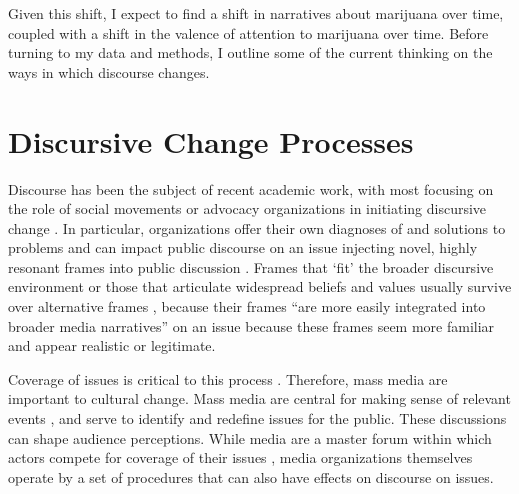 Given this shift, I expect to find a shift in narratives about marijuana over time, coupled with a shift in the valence of attention to marijuana over time. Before turning to my data and methods, I outline some of the current thinking on the ways in which discourse changes. 




%

%







\section{Discursive Change Processes}

Discourse has been the subject of recent academic work, with most focusing on the role of social movements or advocacy organizations in initiating discursive change \citep{bail_2012,earl_2004,mccammon_et_al_2007,ghaziani_and_baldassarri_2011,vasi_et_al_2015,gamson_and_modigliani_1989}. In particular, organizations offer their own diagnoses of and solutions to problems and can impact public discourse on an issue injecting novel, highly resonant frames into public discussion \citep{benford_and_snow_2000}. Frames that `fit' the broader discursive environment \citep{mccammon_et_al_2007} or those that articulate widespread beliefs and values usually survive over alternative frames \citep{mccammon_et_al_2001,snow_et_al_2007,gamson_and_modigliani_1989}, because their frames ``are more easily integrated into broader media narratives'' on an issue because these frames seem more familiar \citep{bail_2012} and appear realistic or legitimate. 

Coverage of issues is critical to this process \citep{amenta_et_al_2009,ferree_et_al_2002}. Therefore, mass media are important to cultural change. Mass media are central for making sense of relevant events \citep{gamson_and_modigliani_1989}, and serve to identify and redefine issues for the public. These discussions can shape audience perceptions. While media are a master forum within which actors compete for coverage of their issues \citep{amenta_et_al_2012}, media organizations themselves operate by a set of procedures that can also have effects on discourse on issues. 


